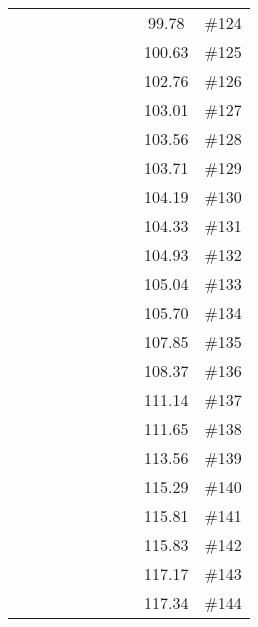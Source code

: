 \begin{longtable}{|c|c|c|c|c|c|c|c|c|c|}
 \x    & \x    &       &       & \x    &       & \x    &       & 99.78 & \#124 \\
 \x    & \x    & \x    &       &       & \x\m  &       & \x    & 100.63 & \#125 \\
 \x    & \x    &       & \x    &       &       &       & \x\m  & 102.76 & \#126 \\
 \x    & \x    &       & \x    & \x\m  &       & \x\m  &       & 103.01 & \#127 \\
 \x    & \x    &       &       &       & \x    & \x    &       & 103.56 & \#128 \\
 \x    & \x    &       &       &       & \x    &       & \x    & 103.71 & \#129 \\
 \x    & \x    &       & \x    &       & \x    &       & \x    & 104.19 & \#130 \\
 \x    & \x    &       & \x    &       & \x\m  &       &       & 104.33 & \#131 \\
 \x    & \x    &       &       & \x\m  &       & \x\m  &       & 104.93 & \#132 \\
 \x    & \x    &       & \x    & \x    &       &       & \x    & 105.04 & \#133 \\
 \x    & \x    & \x    &       &       & \x\m  & \x\m  &       & 105.70 & \#134 \\
 \x    & \x    &       &       &       & \x\m  &       & \x\m  & 107.85 & \#135 \\
 \x    & \x    &       & \x    & \x    &       & \x    &       & 108.37 & \#136 \\
 \x    & \x    &       & \x    &       &       & \x    &       & 111.14 & \#137 \\
 \x    & \x    &       & \x    &       &       & \x\m  &       & 111.65 & \#138 \\
 \x    & \x    &       & \x    &       & \x\m  & \x\m  &       & 113.56 & \#139 \\
 \x    & \x    &       & \x    &       &       &       & \x    & 115.29 & \#140 \\
 \x    & \x    &       &       &       &       & \x\m  &       & 115.81 & \#141 \\
 \x    & \x    &       & \x    &       & \x\m  &       & \x\m  & 115.83 & \#142 \\
 \x    & \x    &       & \x    &       & \x    & \x    &       & 117.17 & \#143 \\
 \x    & \x    &       &       &       & \x\m  & \x\m  &       & 117.34 & \#144 \\
\end{longtable}
\normalsize

